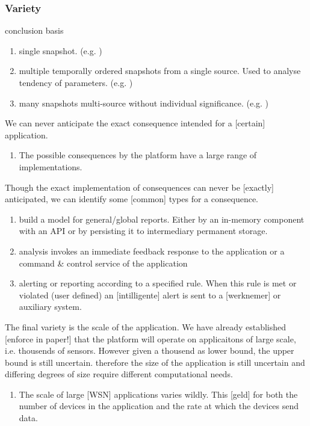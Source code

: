 \subsubsection{Variety}
conclusion basis
\begin{enumerate}[label=V\archid .\arabic*]
\nospace
\item \label{v:basis_single} single snapshot. (e.g. )
\item \label{v:basis_historic} multiple temporally ordered snapshots from a single source. Used to analyse tendency of parameters. (e.g. )
\item \label{v:basis_accumulated} many snapshots multi-source without individual significance. (e.g. )
\end{enumerate}
We can never anticipate the exact consequence intended for a [certain] application.
\begin{enumerate}[label=V\archid .\arabic* , resume]
\nospace
\item \label{v:consequence_implementation} The possible consequences by the platform have a large range of implementations.
\end{enumerate}
Though the exact implementation of consequences can never be [exactly] anticipated, we can identify some [common] types for a consequence.
\begin{enumerate}[label=V\archid .\arabic* , resume]
\nospace
\item \label{v:consequence_general_reporting} build a model for general/global reports. Either by an in-memory component with an API or by persisting it to intermediary permanent storage.
\item \label{v:consequence_feedback} analysis invokes an immediate feedback response to the application or a command \& control service of the application
\item \label{v:consequence_rule_alert} alerting or reporting according to a specified rule. When this rule is met or violated (user defined) an [intilligente] alert is sent to a [werknemer] or auxiliary system.
\end{enumerate}
The final variety is the scale of the application. We have already established [enforce in paper!] that the platform will operate on applicaitons of large scale, i.e. thousends of sensors. However given a thousend as lower bound, the upper bound is still uncertain. therefore the size of the application is still uncertain and differing degrees of size require different computational needs.
\begin{enumerate}[label=V\archid .\arabic* , resume]
\nospace
\item \label{v:consequence_scale} The scale of large [WSN] applications varies wildly. This [geld] for both the number of devices in the application and the rate at which the devices send data.
\end{enumerate}
